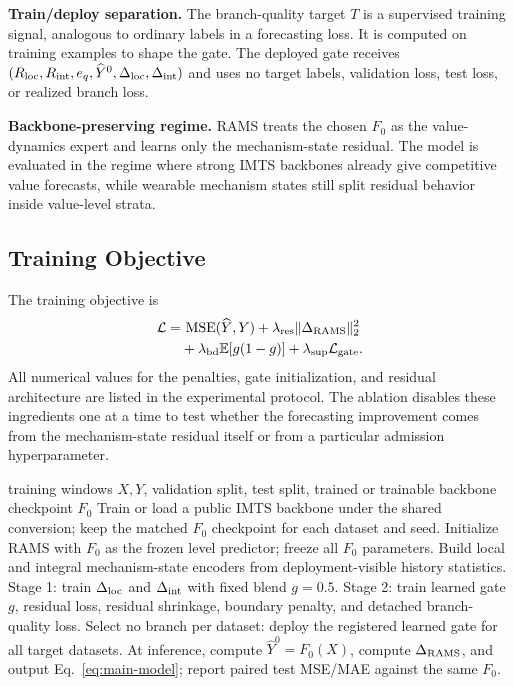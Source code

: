 ﻿\documentclass[10pt,conference]{IEEEtran}
\newcommand{\E}{\mathbb{E}}
\newcommand{\method}{\textnormal{\mbox{RAMS}}}
\begin{document}
\textbf{Train/deploy separation.}
The branch-quality target \(T\) is a supervised training signal, analogous to
ordinary labels in a forecasting loss.  It is computed on training
examples to shape the gate.  The deployed gate receives
\((R_{\rm loc},R_{\rm int},e_q,\widehat Y^0,\Delta_{\rm loc},\Delta_{\rm int})\)
and uses no target labels, validation loss, test loss, or realized branch loss.

\textbf{Backbone-preserving regime.}
\method{} treats the chosen \(F_0\) as the value-dynamics expert and learns
only the mechanism-state residual.  The model is evaluated in the regime where
strong IMTS backbones already give competitive value forecasts, while wearable
mechanism states still split residual behavior inside value-level strata.

\subsection{Training Objective}

The training objective is
\[
\begin{aligned}
\mathcal{L}=&\ \mathrm{MSE}(\widehat{Y},Y)
+\lambda_{\rm res}\|\Delta_{\rm RAMS}\|_2^2\\
&+\lambda_{\rm bd}\E[g(1-g)]
+\lambda_{\rm sup}\mathcal{L}_{\rm gate}.
\end{aligned}
\]
All numerical values for the penalties, gate initialization, and residual
architecture are listed in the experimental protocol.
The ablation disables these ingredients one at a time to test whether the
forecasting improvement comes from the mechanism-state residual itself or from a
particular admission hyperparameter.

\begin{algorithm}[t]
\caption{Registered \method{} training and inference}
\label{alg:ramstpatch}
\small
\begin{algorithmic}[1]
\REQUIRE training windows \(X,Y\), validation split, test split, trained or
trainable backbone checkpoint \(F_0\)
\STATE Train or load a public IMTS backbone under the shared conversion; keep
the matched \(F_0\) checkpoint for each dataset and seed.
\STATE Initialize \method{} with \(F_0\) as the frozen level predictor; freeze
all \(F_0\) parameters.
\STATE Build local and integral mechanism-state encoders from deployment-visible
history statistics.
\STATE Stage 1: train \(\Delta_{\rm loc}\) and \(\Delta_{\rm int}\) with fixed
blend \(g=0.5\).
\STATE Stage 2: train learned gate \(g\), residual loss, residual shrinkage,
boundary penalty, and detached branch-quality loss.
\STATE Select no branch per dataset: deploy the registered learned gate for
all target datasets.
\STATE At inference, compute \(\widehat{Y}^{0}=F_0(X)\), compute
\(\Delta_{\rm RAMS}\), and output Eq.~\eqref{eq:main-model}; report paired
test MSE/MAE against the same \(F_0\).
\end{algorithmic}
\end{algorithm}
\end{document}
